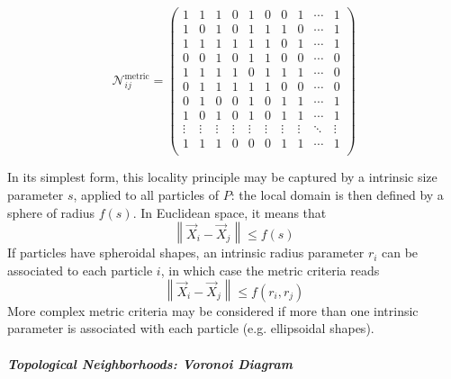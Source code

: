   $$\mathcal{N}^{\text{metric}}_{ij} =  \begin{pmatrix}  1 & 1 & 1 & 0 & 1 & 0 & 0 & 1 & \cdots & 1 \\  1 & 0 & 1 & 0 & 1 & 1 & 1 & 0 & \cdots & 1 \\  1 & 1 & 1 & 1 & 1 & 1 & 0 & 1 & \cdots & 1 \\  0 & 0 & 1 & 0 & 1 & 1 & 0 & 0 & \cdots & 0 \\  1 & 1 & 1 & 1 & 0 & 1 & 1 & 1 & \cdots & 0 \\  0 & 1 & 1 & 1 & 1 & 1 & 0 & 0 & \cdots & 0 \\  0 & 1 & 0 & 0 & 1 & 0 & 1 & 1 & \cdots & 1 \\  1 & 0 & 1 & 0 & 1 & 0 & 1 & 1 & \cdots & 1 \\  \vdots  & \vdots  & \vdots  & \vdots  & \vdots  & \vdots  & \vdots  & \vdots  & \ddots & \vdots  \\  1 & 1 & 1 & 0 & 0 & 0 & 1 & 1 & \cdots & 1 \\  \end{pmatrix}$$ 

In its simplest form, this locality principle may be captured by a intrinsic size parameter $s$, applied to all particles of $P$: the local domain is then defined by a sphere of radius $f(s)$. In Euclidean space, it means that   $$\left\|\vec{X}_i - \vec{X}_j\right\| \leq f(s)$$  If particles have spheroidal shapes, an intrinsic radius parameter $r_i$ can be associated to each particle $i$, in which case the metric criteria reads   $$\left\|\vec{X}_i - \vec{X}_j\right\| \leq f(r_i,r_j)$$  More complex metric criteria may be considered if more than one intrinsic parameter is associated with each particle (e.g. ellipsoidal shapes).

\subparagraph{Topological Neighborhoods: Voronoi Diagram}


